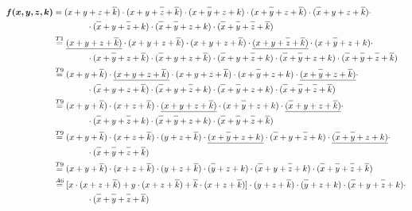 \documentclass{article}
\newcommand*{\oline}[1]{\overline{#1\mathstrut}}
\newcommand{\bigspace}{\quad\quad\quad\quad}
\begin{document}
\begin{align*}
  \bm{f(x,y,z,k)} &= (x+y+z+\oline{k}) \cdot (x+y+\oline{z}+\oline{k}) \cdot (x+\oline{y}+z+k) \cdot (x+\oline{y}+z+\oline{k}) \cdot (\oline{x}+y+z+\oline{k}) \cdot \\
  &\bigspace \cdot (\oline{x}+y+\oline{z}+k) \cdot (\oline{x}+\oline{y}+z+k) \cdot (\oline{x}+\oline{y}+\oline{z}+\oline{k})\\
  &\overset{T1}{=} \underline{(x+y+z+\oline{k})} \cdot (x+y+z+\oline{k}) \cdot (x+y+z+\oline{k}) \cdot \underline{(x+y+\oline{z}+\oline{k})} \cdot (x+\oline{y}+z+k) \cdot \\
  &\bigspace \cdot (x+\oline{y}+z+\oline{k}) \cdot (\oline{x}+y+z+\oline{k}) \cdot (\oline{x}+y+\oline{z}+k) \cdot (\oline{x}+\oline{y}+z+k) \cdot (\oline{x}+\oline{y}+\oline{z}+\oline{k})\\
  &\overset{T9}{=} (x+y+\oline{k}) \cdot \underline{(x+y+z+\oline{k})} \cdot (x+y+z+\oline{k}) \cdot (x+\oline{y}+z+k) \cdot \underline{(x+\oline{y}+z+\oline{k})} \cdot \\
  &\bigspace \cdot (\oline{x}+y+z+\oline{k}) \cdot (\oline{x}+y+\oline{z}+k) \cdot (\oline{x}+\oline{y}+z+k) \cdot (\oline{x}+\oline{y}+\oline{z}+\oline{k})\\
  &\overset{T9}{=} (x+y+\oline{k}) \cdot (x+z+\oline{k}) \cdot \underline{(x+y+z+\oline{k})} \cdot (x+\oline{y}+z+k) \cdot \underline{(\oline{x}+y+z+\oline{k})} \cdot\\
  &\bigspace \cdot (\oline{x}+y+\oline{z}+k) \cdot (\oline{x}+\oline{y}+z+k) \cdot (\oline{x}+\oline{y}+\oline{z}+\oline{k})\\
  &\overset{T9}{=} (x+y+\oline{k}) \cdot (x+z+\oline{k}) \cdot (y+z+\oline{k}) \cdot \underline{(x+\oline{y}+z+k)} \cdot (\oline{x}+y+\oline{z}+k) \cdot \underline{(\oline{x}+\oline{y}+z+k)} \cdot\\
  &\bigspace \cdot (\oline{x}+\oline{y}+\oline{z}+\oline{k})\\
  &\overset{T9}{=} (x+y+\oline{k}) \cdot (x+z+\oline{k}) \cdot (y+z+\oline{k}) \cdot (\oline{y}+z+k) \cdot (\oline{x}+y+\oline{z}+k) \cdot (\oline{x}+\oline{y}+\oline{z}+\oline{k})\\
  &\overset{A6}{=} [x \cdot (x+z+\oline{k}) + y \cdot (x+z+\oline{k}) + \oline{k} \cdot (x+z+\oline{k})] \cdot (y+z+\oline{k}) \cdot (\oline{y}+z+k) \cdot (\oline{x}+y+\oline{z}+k) \cdot\\
  &\bigspace \cdot (\oline{x}+\oline{y}+\oline{z}+\oline{k})\\

\end{align*}
\end{document}
